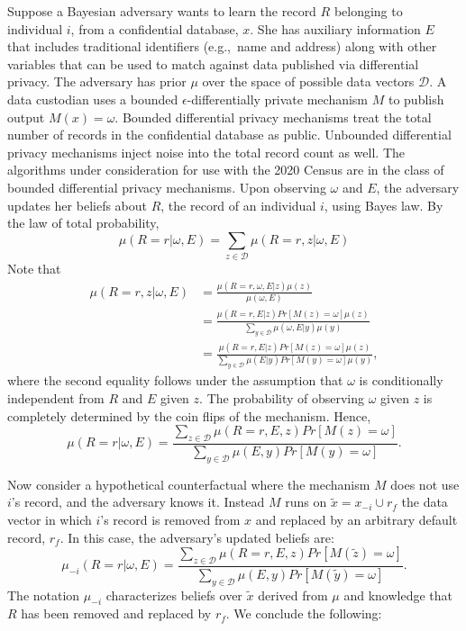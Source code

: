 Suppose a Bayesian adversary wants to learn the record $R$ belonging to individual $i$, from a confidential database, $x$. She has auxiliary information $E$ that includes traditional identifiers (e.g.,\ name and address) along with other variables that can be used to match against data published via differential privacy.
The adversary has prior $\mu$ over the space of possible data vectors $\mathcal{D}$. A data custodian uses a bounded $\epsilon$-differentially private mechanism $M$ to publish output $M(x)=\omega$. Bounded differential privacy mechanisms treat the total number of records in the confidential database as public. Unbounded differential privacy mechanisms inject noise into the total record count as well. The algorithms under consideration for use with the 2020 Census are in the class of bounded differential privacy mechanisms. Upon observing $\omega$ and $E$, the adversary updates her beliefs about $R$, the record of an individual $i$, using Bayes law. By the law of total probability,
$$\mu(R=r | \omega, E) = \sum_{z \in \mathcal{D}} \mu(R=r, z | \omega, E)$$
Note that
\begin{align*}
\mu(R=r, z | \omega, E) &= \frac{\mu(R=r, \omega, E | z)\mu(z)}{\mu(\omega, E)}\\ 
&= \frac{\mu(R=r, E | z) Pr[M(z)=\omega] \mu(z)}{\sum_{y \in \mathcal{D}}\mu(\omega, E | y)\mu(y)} \\
&=\frac{\mu(R=r, E | z) Pr[M(z)=\omega] \mu(z)}{\sum_{y \in \mathcal{D}}\mu(E | y)Pr[M(y)=\omega]\mu(y)},
\end{align*}
where the second equality follows under the assumption that $\omega$ is conditionally independent from $R$ and $E$ given $z$. The probability of observing $\omega$ given $z$ is completely determined by the coin flips of the mechanism.  
Hence,
$$\mu(R=r | \omega, E) = \frac{\sum_{z \in \mathcal{D}}\mu(R=r, E, z) Pr[M(z)=\omega]}{\sum_{y \in \mathcal{D}}\mu(E, y)Pr[M(y)=\omega]}.$$

Now consider a hypothetical counterfactual where the mechanism $M$ does not use $i$'s record, and the adversary knows it. Instead $M$ runs on $\tilde{x} = x_{-i}\cup r_{f}$ the data vector in which $i$'s record is removed from $x$ and replaced by an arbitrary default record, $r_{f}$. In this case, the adversary's updated beliefs are:
$$\mu_{-i}(R=r | \omega, E) = \frac{\sum_{z \in \mathcal{D}}\mu(R=r, E, z) Pr[M(\tilde{z})=\omega]}{\sum_{y \in \mathcal{D}}\mu(E, y)Pr[M(\tilde{y})=\omega]}.$$ The notation $\mu_{-i}$ characterizes beliefs over $\tilde{x}$ derived from $\mu$ and knowledge that $R$ has been removed and replaced by $r_{f}$.
We conclude the following:

